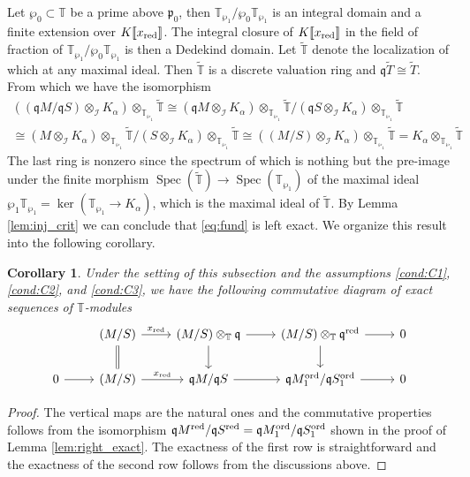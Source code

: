 \documentclass[leqno]{amsart}
\newtheorem{cor}[thm]{Corollary}
\theoremstyle{definition}
\theoremstyle{remark}
\DeclareMathOperator{\Spec}{Spec}
\newcommand{\fp}{\mathfrak{p}}
\newcommand{\fq}{\mathfrak{q}}
\newcommand{\red}{\textnormal{red}}
\newcommand{\xx}{x_\textnormal{red}}
\newcommand{\TT}{\mathbb{T}} %
\newcommand{\I}{\mathcal{I}} %
\newcommand{\ord}{\textnormal{ord}} %
\begin{document}
Let $\wp_0\subset \TT$ be a prime above $\fp_0$,
then $\TT_{\wp_1}/\wp_0\TT_{\wp_1}$
is an integral domain and a finite extension
over $K\llbracket\xx\rrbracket$.
The integral closure of $K\llbracket\xx\rrbracket$
in the field of fraction of 
$\TT_{\wp_1}/\wp_0\TT_{\wp_1}$ is then a Dedekind domain.
Let $\tilde{\TT}$ denote the localization of which
at any maximal ideal.
Then $\tilde{\TT}$ is a discrete valuation ring
and $\fq\tilde{T}\cong \tilde{T}$.
From which we have the isomorphism
\begin{multline*}
((\fq M/\fq S)\otimes_{\I} K_\alpha)
\otimes_{\TT_{\wp_1}}\tilde{\TT}\cong 
(\fq M\otimes_{\I} K_\alpha)
\otimes_{\TT_{\wp_1}}\tilde{\TT}/
(\fq S\otimes_{\I} K_\alpha)
\otimes_{\TT_{\wp_1}}\tilde{\TT}\\\cong
(M\otimes_{\I} K_\alpha)
\otimes_{\TT_{\wp_1}}\tilde{\TT}/
(S\otimes_{\I} K_\alpha)
\otimes_{\TT_{\wp_1}}\tilde{\TT}\cong
((M/S)\otimes_{\I} K_\alpha)
\otimes_{\TT_{\wp_1}}\tilde{\TT}=
K_\alpha \otimes_{\TT_{\wp_1}}\tilde{\TT}
\end{multline*}
The last ring is nonzero since 
the spectrum of which 
is nothing but the pre-image
under the finite morphism
$\Spec(\tilde{\TT})\to \Spec(\TT_{\wp_1})$
of the maximal ideal $\wp_1\TT_{\wp_1}=\ker(\TT_{\wp_1}\to K_\alpha)$,
which is the maximal ideal of $\tilde{\TT}$.
By Lemma \eqref{lem:inj_crit}
we can conclude that \eqref{eq:fund} is left exact.
We organize this result into the following corollary.


\begin{cor}\label{cor:fund}
	Under the setting of this subsection
    and the assumptions
    \ref{cond:C1},
    \ref{cond:C2}, and
    \ref{cond:C3},
    we have the following commutative diagram
    of exact sequences of $\TT$-modules
    \begin{equation}
    \begin{tikzcd}
    & (M/S)
    \arrow[r,"\xx"]\arrow[d,equal] &
    (M/S)\otimes_{\TT}\fq
    \arrow[r]\arrow[d] &
    (M/S)\otimes_{\TT}\fq^\red
    \arrow[r]\arrow[d] &0\\
    0\arrow[r] &
    (M/S)
    \arrow[r,"\xx"] &
    \fq M/\fq S
    \arrow[r] &
    \fq M_1^{\ord}/\fq S_1^{\ord}
    \arrow[r] &0
    \end{tikzcd}
    \end{equation}
\end{cor}
\begin{proof}
The vertical maps are the natural ones
and the commutative properties 
follows from the isomorphism
$\fq M^\red/\fq S^\red=\fq M_1^{\ord}/\fq S_1^{\ord}$
shown in the proof of Lemma \ref{lem:right_exact}.
The exactness of the first row
is straightforward and
the exactness of the second row
follows from the discussions above.
\end{proof}
\end{document}

